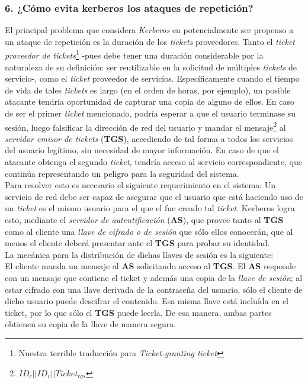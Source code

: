 \documentclass[12pt]{article}
\begin{document}
\subsubsection*{6. ¿Cómo evita kerberos los ataques de repetición?}
El principal problema que considera \textit{Kerberos} en potencialmente ser propenso a un ataque de repetición es la duración de los \textit{tickets} proveedores.
Tanto el \textit{ticket proveedor de tickets}\footnote{Nuestra terrible traducción para \textit{Ticket-granting ticket}} -pues debe tener una duración considerable por la naturaleza de su definición: ser reutilizable en la solicitud de múltiples \textit{tickets} de servicio-, como
el \textit{ticket} proveedor de servicios. Específicamente cuando el tiempo de vida de tales \textit{tickets} es largo (en el orden de horas, por ejemplo), un posible atacante tendría oportunidad de capturar una copia de alguno de ellos. En caso de ser el primer \textit{ticket} mencionado, podría esperar a que el usuario terminase su sesión, luego falsificar la dirección de red del usuario y mandar el mensaje\footnote{$ID_c||ID_v||Ticket_{tgs}$} al \textit{servidor emisor de tickets} (\textbf{TGS}), accediendo de tal forma a todos los servicios del usuario legítimo, sin necesidad de mayor información. En caso de que el atacante obtenga
el segundo \textit{ticket}, tendría acceso al servicio correspondiente, que continúa representando un peligro para la seguridad del sistema.\\

Para resolver esto es necesario el siguiente requerimiento en el sistema: Un servicio de red debe ser capaz de asegurar que el usuario que está haciendo uso de un \textit{ticket} es el mismo usuario para el que el fue creado tal \textit{ticket}. Kerberos logra esto, mediante el \textit{servidor
  de autentificación} (\textbf{AS}), que provee tanto al \textbf{TGS} como al cliente una \textit{llave de cifrado o de sesión} que sólo ellos conocerán, que
al menos el cliente deberá presentar ante el \textbf{TGS} para probar su identidad. \\

La mecánica para la distribución de dichas llaves de sesión es la siguiente:\\
El cliente manda un mensaje al \textbf{AS} solicitando acceso al \textbf{TGS}. El \textbf{AS} responde con un mensaje que contiene el ticket y además una copia de la \textit{llave de sesión}; al estar cifrado con una llave derivada de la contraseña del usuario, sólo el cliente de dicho usuario puede descifrar el contenido. Esa misma llave está incluída en el ticket, por lo que sólo el \textbf{TGS} puede leerla. De esa manera, ambas partes
obtienen su copia de la llave de manera segura.\\
\end{document}
